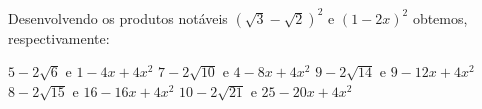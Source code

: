 Desenvolvendo os produtos notáveis $(\sqrt{3}-\sqrt{2})^2$ e $(1-2x)^2$ obtemos, respectivamente:

$5-2\sqrt{6}$ e $1-4x+4x^2$
$7-2\sqrt{10}$ e $4-8x+4x^2$
$9-2\sqrt{14}$ e $9-12x+4x^2$
$8-2\sqrt{15}$ e $16-16x+4x^2$
$10-2\sqrt{21}$ e $25-20x+4x^2$


